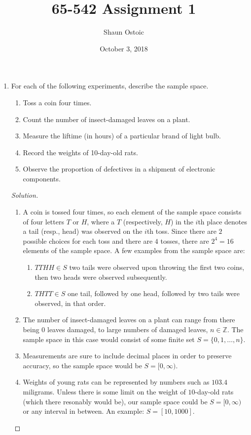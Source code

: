 \documentclass[12pt]{article}
\theoremstyle{definition}
\theoremstyle{plain}
\newenvironment{solution}
  {\begin{proof}[Solution]}
  {\end{proof}}
\begin{document}
\baselineskip 18pt
  
\title{65-542 Assignment 1}

\author{Shaun Ostoic}
\date{October 3, 2018}

\maketitle

\begin{enumerate}
\item For each of the following experiments, describe the sample space. 
\begin{enumerate}
\item Toss a coin four times.
\item Count the number of insect-damaged leaves on a plant.
\item Measure the liftime (in hours) of a particular brand of light bulb.
\item Record the weights of 10-day-old rats.
\item Observe the proportion of defectives in a shipment of electronic components.
\end{enumerate}
\begin{solution}
\begin{enumerate}
	\item A coin is tossed four times, so each element of the sample space consists of four letters $ T $ or $ H $, where a $ T $ (respectively, $ H $) in the $ i $th place denotes a tail (resp., head) was observed on the $ i $th toss. Since there are $ 2 $ possible choices for each toss and there are $ 4 $ tosses, there are $ 2^4 = 16 $ elements of the sample space. A few examples from the sample space are:
		\begin{enumerate}
		\item $ TTHH \in S $ two tails were observed upon throwing the first two coins, then two heads were observed subsequently.
		\item $ THTT \in S$ one tail, followed by one head, followed by two tails were observed, in that order.
		\end{enumerate}
	\item The number of insect-damaged leaves on a plant can range from there being $ 0 $ leaves damaged, to large numbers of damaged leaves, $ n \in \mathbb{Z} $. The sample space in this case would consist of some finite set $ S = \{ 0, 1, \ldots, n \} $.
	
	\item Measurements are sure to include decimal places in order to preserve accuracy, so the sample space would be $ S = [0, \infty) $.
	\item Weights of young rats can be represented by numbers such as $ 103.4 $ miligrams. Unless there is some limit on the weight of $ 10 $-day-old rats (which there resonably would be), our sample space could be $ S = [0, \infty) $ or any interval in between. An example: $ S = [10, 1000] $.
	

\end{enumerate}
\end{solution}
\end{enumerate}
\end{document}
